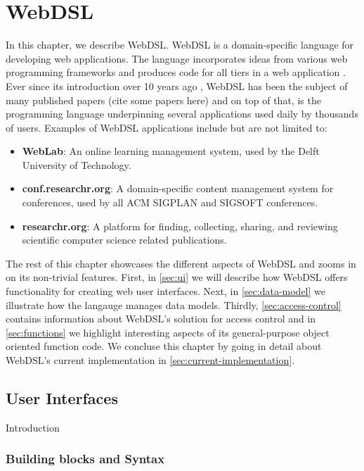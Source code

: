 
\chapter{\label{chap:webdsl}WebDSL}

  In this chapter, we describe WebDSL. WebDSL is a domain-specific language for developing web applications. The language incorporates ideas from various web programming frameworks and produces code for all tiers in a web application \autocite{Groenewegen2020}. Ever since its introduction over 10 years ago \autocite{Visser07}, WebDSL has been the subject of many published papers (cite some papers here) and on top of that, is the programming language underpinning several applications used daily by thousands of users. Examples of WebDSL applications include but are not limited to:
  \begin{itemize}
    \item \textbf{WebLab}: An online learning management system, used by the Delft University of Technology.
    \item \textbf{conf.researchr.org}: A domain-specific content management system for conferences, used by all ACM SIGPLAN and SIGSOFT conferences.
    \item \textbf{researchr.org}: A platform for finding, collecting, sharing, and reviewing scientific computer science related publications.
  \end{itemize}

  The rest of this chapter showcases the different aspects of WebDSL and zooms in on its non-trivial features. First, in \cref{sec:ui} we will describe how WebDSL offers functionality for creating web user interfaces. Next, in \cref{sec:data-model} we illustrate how the langauge manages data models. Thirdly, \cref{sec:access-control} contains information about WebDSL's solution for access control and in \cref{sec:functions} we highlight interesting aspects of its general-purpose object oriented function code. We concluse this chapter by going in detail about WebDSL's current implementation in \cref{sec:current-implementation}.

  \section{\label{sec:ui}User Interfaces}

    Introduction

    \subsection{\label{subsec:building-blocks}Building blocks and Syntax}

